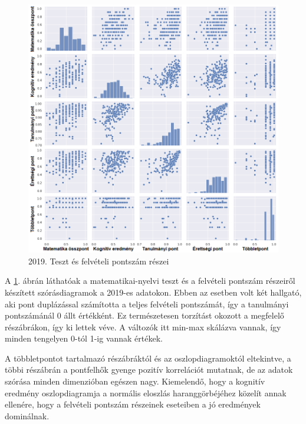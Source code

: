 \documentclass[12pt]{article}
\begin{document}
\begin{figure}[H]
\centering
\includegraphics[width=\textwidth]{kepek/2019minmax3.png}
\caption{2019. Teszt és felvételi pontszám részei}
\label{fig:2019minmax3}
\end{figure}

A \ref{fig:2019minmax3}. ábrán láthatóak a matematikai-nyelvi teszt és a felvételi pontszám részeiről készített szórásdiagramok a 2019-es adatokon. Ebben az esetben volt két hallgató, aki pont duplázással számította a teljes felvételi pontszámát, így a tanulmányi pontszámánál 0 állt értékként. Ez természetesen torzítást okozott a megfelelő részábrákon, így ki lettek véve. A változók itt min-max skálázva vannak, így minden tengelyen 0-tól 1-ig vannak értékek.

A többletpontot tartalmazó részábráktól és az oszlopdiagramoktól eltekintve, a többi részábrán a pontfelhők gyenge pozitív korrelációt mutatnak, de az adatok szórása minden dimenzióban egészen nagy. Kiemelendő, hogy a kognitív eredmény oszlopdiagramja a normális eloszlás haranggörbéjéhez közelít annak ellenére, hogy a felvételi pontszám részeinek eseteiben a jó eredmények dominálnak.
\end{document}
